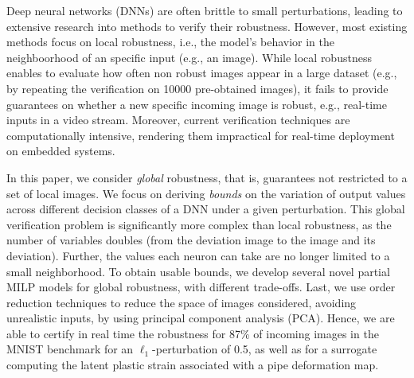 Deep neural networks (DNNs) are often brittle to small perturbations, leading to extensive research into methods to verify their robustness. However, most existing methods focus on local robustness, i.e., the model's behavior in the neighboorhood of an specific input (e.g., an image). While local robustness enables to evaluate how often non robust images appear in a large dataset (e.g., by repeating the verification on 10000 pre-obtained images), it fails to provide guarantees on whether a new specific incoming image is robust, e.g., real-time inputs in a video stream. Moreover, current verification techniques are computationally intensive, rendering them impractical for real-time deployment on embedded systems. 

In this paper, we consider {\em global} robustness, that is, guarantees not restricted to a set of local images. We focus on deriving {\em bounds} on the variation of output values across different decision classes of a DNN under a given perturbation. This global verification problem is significantly more complex than local robustness, as the number of variables doubles (from the deviation image to the image and its deviation). Further, the values each neuron can take are no longer limited to a small neighborhood. To obtain usable bounds, we develop several novel partial MILP models for global robustness, with different trade-offs. Last, we use order reduction techniques to reduce the space of images considered, avoiding unrealistic inputs, by using principal component analysis (PCA). Hence, we are able to certify in real time the robustness for 87\% of incoming images in the MNIST benchmark for an $\ell_1$-perturbation of 0.5, as well as for a surrogate computing the latent plastic strain associated with a pipe deformation map.